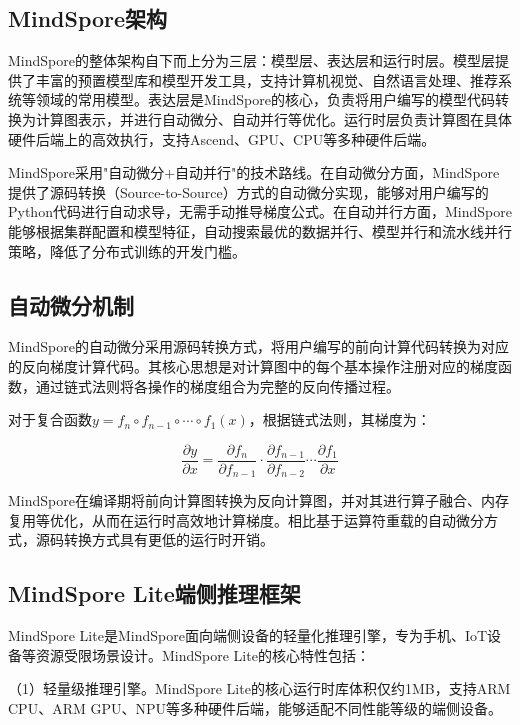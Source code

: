 \subsection{MindSpore架构}

MindSpore的整体架构自下而上分为三层：模型层、表达层和运行时层。模型层提供了丰富的预置模型库和模型开发工具，支持计算机视觉、自然语言处理、推荐系统等领域的常用模型。表达层是MindSpore的核心，负责将用户编写的模型代码转换为计算图表示，并进行自动微分、自动并行等优化。运行时层负责计算图在具体硬件后端上的高效执行，支持Ascend、GPU、CPU等多种硬件后端。

MindSpore采用"自动微分+自动并行"的技术路线。在自动微分方面，MindSpore提供了源码转换（Source-to-Source）方式的自动微分实现，能够对用户编写的Python代码进行自动求导，无需手动推导梯度公式。在自动并行方面，MindSpore能够根据集群配置和模型特征，自动搜索最优的数据并行、模型并行和流水线并行策略，降低了分布式训练的开发门槛。

\subsection{自动微分机制}

MindSpore的自动微分采用源码转换方式，将用户编写的前向计算代码转换为对应的反向梯度计算代码。其核心思想是对计算图中的每个基本操作注册对应的梯度函数，通过链式法则将各操作的梯度组合为完整的反向传播过程。

对于复合函数$y = f_n \circ f_{n-1} \circ \cdots \circ f_1(x)$，根据链式法则，其梯度为：

\begin{equation}
	\frac{\partial y}{\partial x} = \frac{\partial f_n}{\partial f_{n-1}} \cdot \frac{\partial f_{n-1}}{\partial f_{n-2}} \cdots \frac{\partial f_1}{\partial x}
	\label{eq:chain_rule}
\end{equation}

MindSpore在编译期将前向计算图转换为反向计算图，并对其进行算子融合、内存复用等优化，从而在运行时高效地计算梯度。相比基于运算符重载的自动微分方式，源码转换方式具有更低的运行时开销。

\subsection{MindSpore Lite端侧推理框架}

MindSpore Lite是MindSpore面向端侧设备的轻量化推理引擎，专为手机、IoT设备等资源受限场景设计\cite{mindspore2021lite}。MindSpore Lite的核心特性包括：

（1）轻量级推理引擎。MindSpore Lite的核心运行时库体积仅约1MB，支持ARM CPU、ARM GPU、NPU等多种硬件后端，能够适配不同性能等级的端侧设备。

